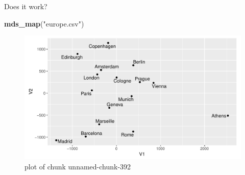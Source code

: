 \documentclass[ignorenonframetext,]{beamer}
\newenvironment{Shaded}{\begin{snugshade}}{\end{snugshade}}
\newcommand{\KeywordTok}[1]{\textcolor[rgb]{0.13,0.29,0.53}{\textbf{#1}}}
\newcommand{\NormalTok}[1]{#1}
\newcommand{\StringTok}[1]{\textcolor[rgb]{0.31,0.60,0.02}{#1}}
\begin{document}
\begin{frame}[fragile]{Does it work?}
\protect\hypertarget{does-it-work}{}

\begin{Shaded}
\begin{Highlighting}[]
\KeywordTok{mds_map}\NormalTok{(}\StringTok{"europe.csv"}\NormalTok{)}
\end{Highlighting}
\end{Shaded}

\begin{figure}
\centering
\includegraphics{figure/unnamed-chunk-392-1.pdf}
\caption{plot of chunk unnamed-chunk-392}
\end{figure}

\end{frame}
\end{document}
